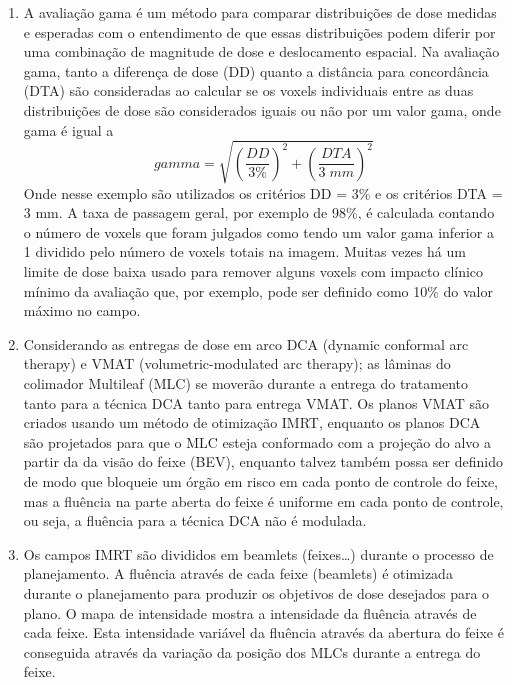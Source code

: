 \documentclass[11pt,a4paper]{article}
\newcounter{exemplo}
\begin{document}
\begin{enumerate}
        \item A avaliação gama é um método para comparar distribuições de dose medidas e esperadas com o entendimento de que essas distribuições podem diferir por uma combinação de magnitude de dose e deslocamento espacial. Na avaliação gama, tanto a diferença de dose (DD) quanto a distância para concordância (DTA) são consideradas ao calcular se os voxels individuais entre as duas distribuições de dose são considerados iguais ou não por um valor gama, onde gama é igual a $$gamma = \sqrt{\left(\frac{DD}{3\%}\right)^2 + \left(\frac{DTA}{3\;mm}\right)^2}$$ Onde nesse exemplo são utilizados os critérios DD = 3\% e os critérios DTA = 3 mm. A taxa de passagem geral, por exemplo de 98\%, é calculada contando o número de voxels que foram julgados como tendo um valor gama inferior a 1 dividido pelo número de voxels totais na imagem. Muitas vezes há um limite de dose baixa usado para remover alguns voxels com impacto clínico mínimo da avaliação que, por exemplo, pode ser definido como 10\% do valor máximo no campo.

        \item Considerando as entregas de dose em arco DCA (dynamic conformal arc therapy) e VMAT (volumetric-modulated arc therapy); as lâminas do colimador Multileaf (MLC) se moverão durante a entrega do tratamento tanto para a técnica DCA tanto para entrega VMAT. Os planos VMAT são criados usando um método de otimização IMRT, enquanto os planos DCA são projetados para que o MLC esteja conformado com a projeção do alvo a partir da da visão do feixe (BEV), enquanto talvez também possa ser definido de modo que bloqueie um órgão em risco em cada ponto de controle do feixe, mas a fluência na parte aberta do feixe é uniforme em cada ponto de controle, ou seja, a fluência para a técnica DCA não é modulada.

        \item Os campos IMRT são divididos em beamlets (feixes\dots) durante o processo de planejamento. A fluência através de cada feixe (beamlets) é otimizada durante o planejamento para produzir os objetivos de dose desejados para o plano. O mapa de intensidade mostra a intensidade da fluência através de cada feixe. Esta intensidade variável da fluência através da abertura do feixe é conseguida através da variação da posição dos MLCs durante a entrega do feixe.


\end{enumerate}
\end{document}

